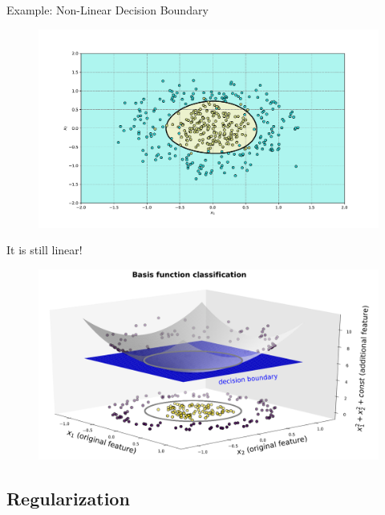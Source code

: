 \begin{frame}{Example: Non-Linear Decision Boundary}{}
	\vspace*{-2mm}
	\begin{figure}
		\includegraphics[scale=0.325]{07_logistic_regression/02_img/logreg_example_non_linear_boundary}
	\end{figure}
\end{frame}


\begin{frame}{It is still linear!}{}
	\begin{figure}
		\includegraphics[scale=0.275]{07_logistic_regression/02_img/basis_function_classification_visualization}
	\end{figure}
\end{frame}


\subsection{Regularization}

